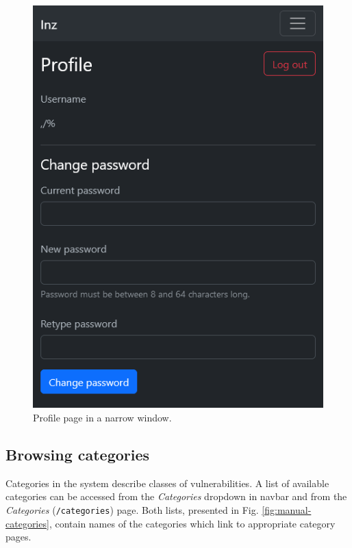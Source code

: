 \begin{figure}
    \centering
    \includegraphics{img/manual-profile.png}
    \caption{Profile page in a narrow window.}
    \label{fig:manual-profile}
\end{figure}

\subsection{Browsing categories}

Categories in the system describe classes of vulnerabilities. A list of available categories can be accessed from the \textit{Categories} dropdown in navbar and from the \textit{Categories} (\texttt{/categories}) page. Both lists, presented in Fig. \ref{fig:manual-categories}, contain names of the categories which link to appropriate category pages.


